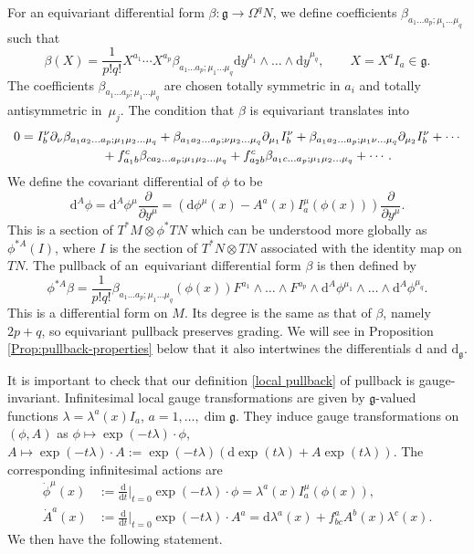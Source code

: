 \documentclass[10pt,a4paper]{amsart}
\newcommand{\g}{{\mathfrak{g}}}
\newcommand{\1}{{\mathbb{1}}}
\def \d{\mathrm{d}}
\numberwithin{equation}{section}
\begin{document}
For an equivariant differential form $\beta\colon \g\to\Omega^q N$, we define coefficients $\beta_{a_1\dots a_p;\mu_1\dots\mu_q}$ such that
\begin{equation*}
\beta(X) = \frac{1}{p!q!}X^{a_1}\cdots X^{a_p}\beta_{a_1\dots a_p;\mu_1\dots\mu_q}\d y^{\mu_1}\wedge\dots\wedge\d y^{\mu_q},\qquad X=X^aI_a\in\g.
\end{equation*}
The coefficients $\beta_{a_1\dots a_p;\mu_1\dots\mu_q}$ are chosen totally symmetric in $a_i$ and totally antisymmetric in~$\mu_j$. The condition that $\beta$ is equivariant translates into
\begin{gather}
 0=I_b^\nu\partial_\nu\beta_{a_1a_2\dots a_p;\mu_1\mu_2\dots\mu_q}
+ \beta_{a_1a_2\dots a_p;\nu\mu_2\dots\mu_q}\partial_{\mu_1}I_b^\nu + \beta_{a_1a_2\dots a_p;\mu_1\nu\dots\mu_q}\partial_{\mu_2}I_b^\nu + \cdots \nonumber\\
 \hphantom{0=}{} +f^c_{a_1 b}\beta_{ca_2\dots a_p;\mu_1\mu_2\dots\mu_q}+f^c_{a_2 b}\beta_{a_1c\dots a_p;\mu_1\mu_2\dots\mu_q}+\cdots .\label{Lie derivative}
\end{gather}
We define the covariant differential of $\phi$ to be
\begin{equation}\label{cov-derivative}
\d^A\phi = \d^A\phi^\mu \frac{\partial}{\partial y^\mu} = (\d\phi^\mu(x) -A^a(x)I^\mu_a(\phi(x)))\frac{\partial}{\partial y^\mu}.
\end{equation}
This is a section of $T^\ast M\otimes\phi^\ast TN$ which can be understood more globally as $\phi^{\ast A}(I)$, where $I$ is the section of $T^\ast N\otimes TN$ associated with the identity map on $TN$. The pullback of an~equivariant differential form $\beta$ is then defined by
\begin{equation}\label{local pullback}
\phi^{\ast A}\beta = \frac{1}{p!q!}\beta_{a_1\dots a_p;\mu_1\dots\mu_q}(\phi(x)) F^{a_1}\wedge\dots\wedge F^{a_p}\wedge \d^A\phi^{\mu_1}\wedge\dots\wedge \d^A\phi^{\mu_q}.
\end{equation}
This is a differential form on $M$. Its degree is the same as that of $\beta$, namely $2p+q$, so equivariant pullback preserves grading. We will see in Proposition \ref{Prop:pullback-properties} below that it also intertwines the differentials $\d$ and $\d_\g$.

It is important to check that our definition \eqref{local pullback} of pullback is gauge-invariant. Infinitesimal local gauge transformations are given by $\g$-valued functions $\lambda=\lambda^a(x)I_a$, $a=1,\dots,\dim\g$. They induce gauge transformations on $(\phi,A)$ as $\phi\mapsto\exp(-t\lambda)\cdot \phi$, $A\mapsto\exp(-t\lambda)\cdot A := \exp(-t\lambda)(\d\exp(t\lambda)+A\exp(t\lambda))$. The corresponding infinitesimal actions are
\begin{align}
\dot{\phi}^\mu(x)&:=\frac{\d}{\d t}\Big|_{t=0}\exp(-t\lambda)\cdot \phi = \lambda^a(x)I_a^\mu(\phi(x)), \label{gt phi}\\
\dot{A}^a(x) &:=\frac{\d}{\d t}\Big|_{t=0}\exp(-t\lambda)\cdot A^a= \d\lambda^a(x) + f^a_{bc}A^b(x)\lambda^c(x)\label{gt A}.
\end{align}
We then have the following statement.
\end{document}
